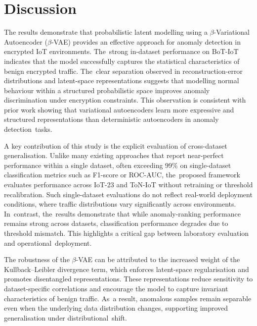 \documentclass[futureinternet,article,accept,moreauthors]{Definitions/mdpi}
\begin{document}


\section{Discussion} \label{sec6}

The results demonstrate that probabilistic latent modelling using a $\beta$-Variational Autoencoder ($\beta$-VAE) provides an effective approach for anomaly detection in encrypted IoT environments. The~strong in-dataset performance on BoT-IoT indicates that the model successfully captures the statistical characteristics of benign encrypted traffic. The~clear separation observed in reconstruction-error distributions and latent-space representations suggests that modelling normal behaviour within a structured probabilistic space improves anomaly discrimination under encryption constraints. This observation is consistent with prior work showing that variational autoencoders learn more expressive and structured representations than deterministic autoencoders in anomaly detection~tasks.

A key contribution of this study is the explicit evaluation of cross-dataset generalisation. Unlike many existing approaches that report near-perfect performance within a single dataset, often exceeding 99\% on single-dataset classification metrics such as F1-score or ROC-AUC, the~proposed framework evaluates performance across IoT-23 and ToN-IoT without retraining or threshold recalibration. Such single-dataset evaluations do not reflect real-world deployment conditions, where traffic distributions vary significantly across environments. In~contrast, the~results demonstrate that while anomaly-ranking performance remains strong across datasets, classification performance degrades due to threshold mismatch. This highlights a critical gap between laboratory evaluation and operational~deployment.

The robustness of the $\beta$-VAE can be attributed to the increased weight of the Kullback--Leibler divergence term, which enforces latent-space regularisation and promotes disentangled representations. These representations reduce sensitivity to dataset-specific correlations and encourage the model to capture invariant characteristics of benign traffic. As~a result, anomalous samples remain separable even when the underlying data distribution changes, supporting improved generalisation under distributional~shift.
\end{document}

